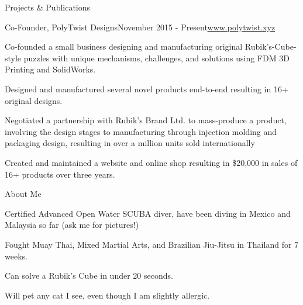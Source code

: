 \documentclass{resume} %
\begin{document}
\begin{rSection}{Projects \& Publications}
\begin{rSubsection}{Co-Founder, PolyTwist Designs}{November 2015 - Present}{\url{www.polytwist.xyz}}{}
\item Co-founded a small business designing and manufacturing original Rubik's-Cube-style puzzles with unique mechanisms, challenges, and solutions using FDM 3D Printing and SolidWorks.
\item Designed and manufactured several novel products end-to-end resulting in 16+ original designs.
\item Negotiated a partnership with Rubik's Brand Ltd. to mass-produce a product, involving the design stages to manufacturing through injection molding and packaging design, resulting in over a million units sold internationally
\item Created and maintained a website and online shop resulting in \$20,000 in sales of 16+ products over three years.
\end{rSubsection}

\end{rSection}

\begin{comment}
\begin{rSection}{Relevant Coursework}
\begin{tabular}{ @{} >{\bfseries}l @{\hspace{6ex}} l }
Experimental Physics & DAQ with LabVIEW, Electronics, 

\end{tabular}
\end{rSection}
\end{comment}

\begin{rSection}{About Me}
\begin{rSubsection}{}{}{}{}{}
\item Certified Advanced Open Water SCUBA diver, have been diving in Mexico and Malaysia so far (ask me for pictures!)
\item Fought Muay Thai, Mixed Martial Arts, and Brazilian Jiu-Jitsu in Thailand for 7 weeks.
\item Can solve a Rubik's Cube in under 20 seconds.
\item Will pet any cat I see, even though I am slightly allergic.
\end{rSubsection}
\end{rSection}
\end{document}

